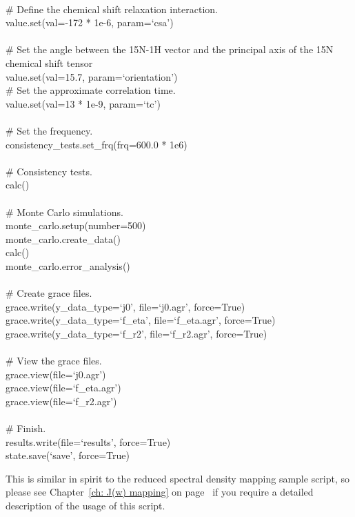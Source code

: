 \begin{exampleenv}
 \\
\# Define the chemical shift relaxation interaction. \\
value.set(val=-172 * 1e-6, param=`csa') \\
 \\
\# Set the angle between the 15N-1H vector and the principal axis of the 15N chemical shift tensor \\
value.set(val=15.7, param=`orientation')
 \\
\# Set the approximate correlation time. \\
value.set(val=13 * 1e-9, param=`tc') \\
 \\
\# Set the frequency. \\
consistency\_tests.set\_frq(frq=600.0 * 1e6) \\
 \\
\# Consistency tests. \\
calc() \\
 \\
\# Monte Carlo simulations. \\
monte\_carlo.setup(number=500) \\
monte\_carlo.create\_data() \\
calc() \\
monte\_carlo.error\_analysis() \\
 \\
\# Create grace files. \\
grace.write(y\_data\_type=`j0', file=`j0.agr', force=True) \\
grace.write(y\_data\_type=`f\_eta', file=`f\_eta.agr', force=True) \\
grace.write(y\_data\_type=`f\_r2', file=`f\_r2.agr', force=True) \\
 \\
\# View the grace files. \\
grace.view(file=`j0.agr') \\
grace.view(file=`f\_eta.agr') \\
grace.view(file=`f\_r2.agr') \\
 \\
\# Finish. \\
results.write(file=`results', force=True) \\
state.save(`save', force=True)
\end{exampleenv}

This is similar in spirit to the reduced spectral density mapping sample script, so please see Chapter~\ref{ch: J(w) mapping} on page~\pageref{ch: J(w) mapping} if you require a detailed description of the usage of this script.
